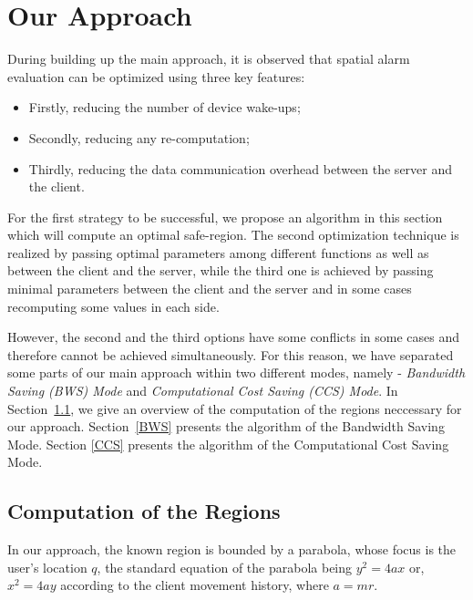 \chapter{Our Approach}
\label{chap:ourapp}




During building up the main approach, it is observed that spatial alarm evaluation can be optimized using three key features: 
\begin{itemize}
\setlength\itemsep{0em}
\item Firstly, reducing the number of device wake-ups;
\item Secondly, reducing any re-computation;
\item Thirdly, reducing the data communication overhead between the server and the client.
\end{itemize}

For the first strategy to be successful, we propose an algorithm in this section which will compute an optimal safe-region. The second optimization technique is realized by passing optimal parameters among different functions as well as between the client and the server, while the third one is achieved by passing minimal parameters between the client and the server and in some cases recomputing some values in each side.

However, the second and the third options have some conflicts in some cases and therefore cannot be achieved simultaneously. For this reason, we have separated some parts of our main approach within two different modes, namely - \textit{Bandwidth Saving (BWS) Mode} and \textit{Computational Cost Saving (CCS) Mode}.
\vspace{5pt}
In Section~\ref{Comp_reg}, we give an overview of the computation of the regions neccessary for our approach. Section~\ref{BWS} presents the algorithm of the Bandwidth Saving Mode. Section \ref{CCS} presents the algorithm of the Computational Cost Saving Mode.

\section{Computation of the Regions}
\label{Comp_reg}
In our approach, the known region is bounded by a parabola, whose focus is the user's location $q$, the standard equation of the parabola being $y^2=4ax$ or, $x^2=4ay$ according to the client movement history, where $ a=mr$.\\

